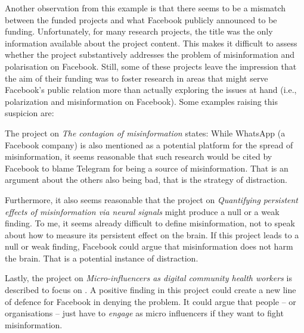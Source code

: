 Another observation from this example is that there seems to be a mismatch between the funded projects and what Facebook publicly announced to be funding.
Unfortunately, for many research projects, the title was the only information available about the project content. 
This makes it difficult to assess whether the project substantively addresses the problem of misinformation and polarisation on Facebook.
Still, some of these projects leave the impression that the aim of their funding was to foster research in areas that might serve Facebook's public relation more than actually exploring the issues at hand (i.e., polarization and misinformation on Facebook).
Some examples raising this suspicion are:

The project on \emph{The contagion of misinformation} states:  While WhatsApp (a Facebook company) is also mentioned as a potential platform for the spread of misinformation, it seems reasonable that such research would be cited by Facebook to blame Telegram for being a source of misinformation. 
That is an argument about the others also being bad, that is the strategy of distraction. 

Furthermore, it also seems reasonable that the project on \emph{Quantifying persistent effects of misinformation via neural signals} might produce a null or a weak finding. 
To me, it seems already difficult to define misinformation, not to speak about how to measure its persistent effect on the brain. 
If this project leads to a null or weak finding, Facebook could argue that misinformation does not harm the brain. That is a potential instance of distraction.

Lastly, the project on \emph{Micro-influencers as digital community health workers} is described to focus on  \citep{cottingham_projects_nodate}.
A positive finding in this project could create a new line of defence for Facebook in denying the problem.
It could argue that people -- or organisations -- just have to \textit{engage} as micro influencers if they want to fight misinformation.

